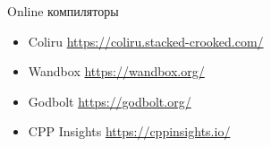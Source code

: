\documentclass[unknownkeysallowed,xcolor=table]{beamer}
\begin{document}
\begin{frame}{Online компиляторы}
\begin{itemize}
  \item Coliru  \href{https://coliru.stacked-crooked.com/}{https://coliru.stacked-crooked.com/} \vspace{3em}
  \item Wandbox  \href{https://wandbox.org/}{https://wandbox.org/} \vspace{3em}
  \item Godbolt  \href{https://godbolt.org/}{https://godbolt.org/} \vspace{3em}
  \item CPP Insights \href{https://cppinsights.io/}{https://cppinsights.io/}
\end{itemize}
\end{frame}
\end{document}
